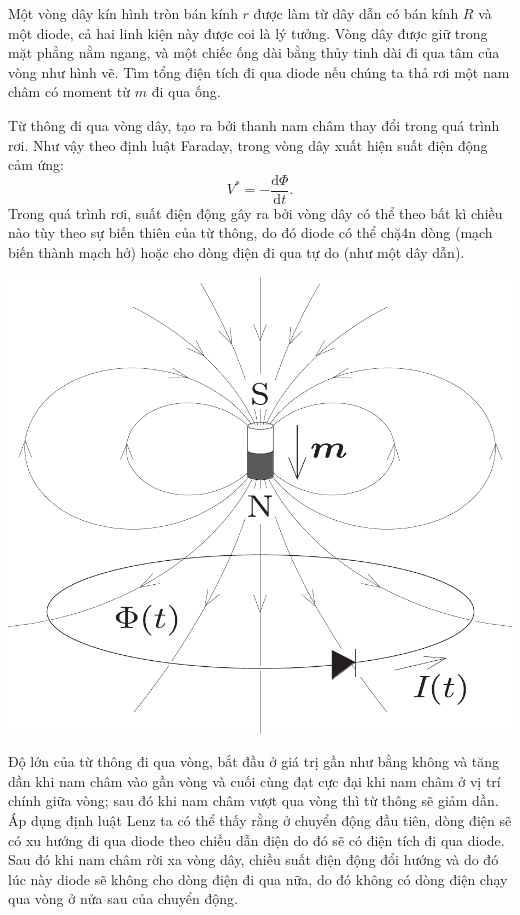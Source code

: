 \begin{vd}
Một vòng dây kín hình tròn bán kính $r$ được làm từ dây dẫn có bán kính $R$ và một diode, cả hai linh kiện này được coi là lý tưởng. Vòng dây được giữ trong mặt phẳng nằm ngang, và một chiếc ống dài bằng thủy tinh dài đi qua tâm của vòng như hình vẽ. Tìm tổng điện tích đi qua diode nếu chúng ta thả rơi một nam châm có moment từ $m$ đi qua ống.
\end{vd}
\begin{loigiai}\[\]
    Từ thông đi qua vòng dây, tạo ra bởi thanh nam châm thay đổi trong quá trình rơi. Như vậy theo định luật Faraday, trong vòng dây xuất hiện suất điện động cảm ứng:
    \[V^*=-\dfrac{\mathrm{d}\Phi}{\mathrm{d}t}.\]
    Trong quá trình rơi, suất điện động gây ra bởi vòng dây có thể theo bất kì chiều nào tùy theo sự biến thiên của từ thông, do đó diode có thể chặ4n dòng (mạch biến thành mạch hở) hoặc cho dòng điện đi qua tự do (như một dây dẫn).
    \begin{center}
        \includegraphics[scale=0.4]{Anh/Nam3.pdf}
    \end{center}
    Độ lớn của từ thông đi qua vòng, bắt đầu ở giá trị gần như bằng không và tăng dần khi nam châm vào gần vòng và cuối cùng đạt cực đại khi nam châm ở vị trí chính giữa vòng; sau đó khi nam châm vượt qua vòng thì từ thông sẽ giảm dần. Áp dụng định luật Lenz ta có thể thấy rằng ở chuyển động đầu tiên, dòng điện sẽ có xu hướng đi qua diode theo chiều dẫn điện do đó sẽ có điện tích đi qua diode. Sau đó khi nam châm rời xa vòng dây, chiều suất điện động đổi hướng và do đó lúc này diode sẽ không cho dòng điện đi qua nữa, do đó không có dòng điện chạy qua vòng ở nửa sau của chuyển động.

\end{loigiai}
